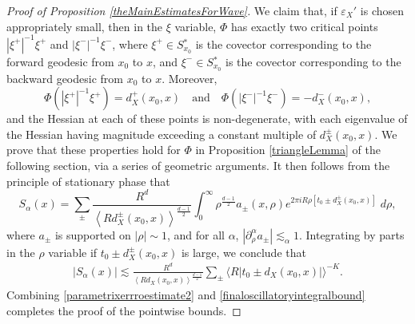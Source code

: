 \begin{proof}[Proof of Proposition \ref{theMainEstimatesForWave}]
%
%
%
We claim that, if $\varepsilon_X'$ is chosen appropriately small, then in the $\xi$ variable, $\Phi$ has exactly two critical points $|\xi^+|^{-1} \xi^+$ and $|\xi^-|^{-1} \xi^-$, where $\xi^+ \in S\!_{x_0}^*$ is the covector corresponding to the forward geodesic from $x_0$ to $x$, and $\xi^- \in S\!_{x_0}^*$ is the covector corresponding to the backward geodesic from $x_0$ to $x$. Moreover,
%
\begin{equation}
    \Phi(|\xi^+|^{-1} \xi^+) = d_X^+(x_0,x) \quad\text{and}\quad \Phi(|\xi^-|^{-1} \xi^-) = - d_X^-(x_0,x),
\end{equation}
%
and the Hessian at each of these points is non-degenerate, with each eigenvalue of the Hessian having magnitude exceeding a constant multiple of $d_X^{\pm}(x_0,x)$. We prove that these properties hold for $\Phi$ in Proposition \ref{triangleLemma} of the following section, via a series of geometric arguments. It then follows from the principle of stationary phase that
%
\begin{equation}
    S\!_\alpha(x) = \sum_{\pm} \frac{R^{d}}{\left\langle R d_X^{\pm}(x_0,x) \right\rangle^{\frac{d-1}{2}}} \int_0^\infty \rho^{\frac{d-1}{2}} a_{\pm}(x,\rho) e^{2 \pi i R \rho [ t_0 \pm d_X^{\pm}(x_0,x)]}\; d\rho,
\end{equation}
%
where $a_{\pm}$ is supported on $|\rho| \sim 1$, and for all $\alpha$, $|\partial_\rho^\alpha a_{\pm}| \lesssim_\alpha 1$. Integrating by parts in the $\rho$ variable if $t_0 \pm d_X^{\pm}(x_0,x)$ is large, we conclude that
%
%
% 
% 
%
\begin{equation} \label{finaloscillatoryintegralbound}
\begin{split}
    |S\!_\alpha(x)| \lesssim \frac{R^{d}}{\left\langle R d_X(x_0,x) \right\rangle^{\frac{d-1}{2}}} \sum_{\pm} \big\langle R |t_0 \pm d_X(x_0,x)| \big\rangle^{-K}.
\end{split}
\end{equation}
%
Combining \eqref{parametrixerrroestimate2} and \eqref{finaloscillatoryintegralbound} completes the proof of the pointwise bounds.


\end{proof}
